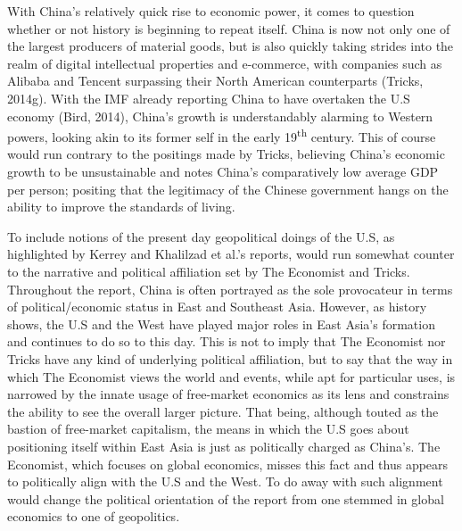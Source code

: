 \documentclass[man,donotrepeattitle,letter]{apa6}
\begin{document}
With China's relatively quick rise to economic power, it comes to question whether or not history is beginning to repeat itself.  China is now not only one of the largest producers of material goods, but is also quickly taking strides into the realm of digital intellectual properties and e-commerce, with companies such as Alibaba and Tencent surpassing their North American counterparts (Tricks, 2014g).  With the IMF already reporting China to have overtaken the U.S economy (Bird, 2014), China's growth is understandably alarming to Western powers, looking akin to its former self in the early 19\textsuperscript{th} century.  This of course would run contrary to the positings made by Tricks, believing China's economic growth to be unsustainable and notes China's comparatively low average GDP per person; positing that the legitimacy of the Chinese government hangs on the ability to improve the standards of living.

To include notions of the present day geopolitical doings of the U.S, as highlighted by Kerrey and Khalilzad et al.'s reports, would run somewhat counter to the narrative and political affiliation set by The Economist and Tricks.  Throughout the report, China is often portrayed as the sole provocateur in terms of political/economic status in East and Southeast Asia.  However, as history shows, the U.S and the West have played major roles in East Asia's formation and continues to do so to this day. This is not to imply that The Economist nor Tricks have any kind of underlying political affiliation, but to say that the way in which The Economist views the world and events, while apt for particular uses, is narrowed by the innate usage of free-market economics as its lens and constrains the ability to see the overall larger picture. That being, although touted as the bastion of free-market capitalism, the means in which the U.S goes about positioning itself within East Asia is just as politically charged as China's. The Economist, which focuses on global economics, misses this fact and thus appears to politically align with the U.S and the West.  To do away with such alignment would change the political orientation of the report from one stemmed in global economics to one of geopolitics.




\nocite{*}
\printbibliography

\end{document}

